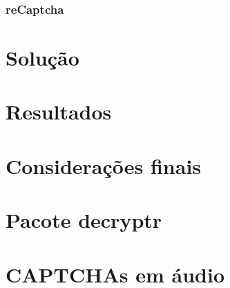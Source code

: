 \documentclass[12pt,]{report}
\begin{document}
\subsection{reCaptcha}\label{recaptcha}

\chapter{Solução}\label{solucao}

\chapter{Resultados}\label{resultados}

\chapter{Considerações finais}\label{consideracoes-finais}

\chapter{Pacote decryptr}\label{pacote-decryptr}

\chapter{CAPTCHAs em áudio}\label{captchas-em-audio}


\end{document}
